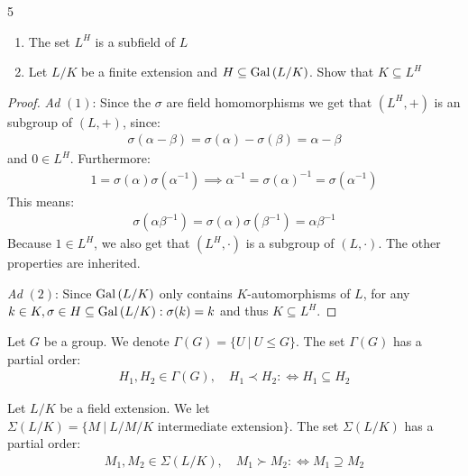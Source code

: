 \documentclass[twoside = false,	%
		headsepline,		%
		parskip = true,
		]{scrbook}						%
\begin{document}
        \begin{exercise}{}{5}
            \begin{enumerate}
                \item The set $L^H$ is a subfield of $L$
                \item Let $L/K$ be a finite extension and $H \subseteq \mathrm{Gal}\left( L/K\right)$. Show that $K \subseteq L^H$
            \end{enumerate}
        \end{exercise}
        \begin{proof}
            \textit{Ad} $(1)$: Since the $\sigma$ are field homomorphisms we get that $(L^H,+)$ is an subgroup of $(L,+)$, since:
            \begin{align*}
                \sigma(\alpha - \beta) = \sigma(\alpha) - \sigma(\beta) = \alpha - \beta
            \end{align*}
            and $0 \in L^H$. Furthermore:
            \begin{align*}
                1 = \sigma(\alpha) \sigma (\alpha^{-1}) \implies \alpha^{-1} = \sigma(\alpha)^{-1} = \sigma (\alpha^{-1})
            \end{align*}
            This means:
            \begin{align*}
                \sigma(\alpha \beta^{-1}) = \sigma(\alpha) \sigma(\beta^{-1}) = \alpha \beta^{-1}
            \end{align*}
            Because $1 \in L^H$, we also get that $(L^H,\cdot)$ is a subgroup of $(L,\cdot)$. The other properties are inherited.
            
            \textit{Ad} $(2)$: Since $\mathrm{Gal}\left( L/K\right)$ only contains $K$-automorphisms of $L$, for any $k \in K, \sigma \in H \subseteq \mathrm{Gal}\left( L/K\right): \sigma(k) = k$ and thus $K \subseteq L^H$.
        \end{proof}
        
        Let $G$ be a group. We denote $\Gamma(G) = \{U \ | \ U \leq G\}$. The set $\Gamma(G)$ has a partial order:
        \begin{align*}
            H_1,H_2 \in \Gamma(G), \quad H_1 \prec H_2 :\Leftrightarrow H_1 \subseteq H_2
        \end{align*}
        
        Let $L/K$ be a field extension. We let $\Sigma(L/K) = \{M \ | \ L/M/K \text{ intermediate extension}\}$. The set $\Sigma(L/K)$ has a partial order:
        \begin{align*}
            M_1,M_2 \in \Sigma(L/K), \quad M_1 \succ M_2 :\Leftrightarrow M_1 \supseteq M_2
        \end{align*}
        
\end{document}
